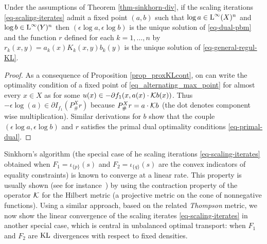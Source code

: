 %
\begin{proposition}
\label{prop_fixpoint}
Under the assumptions of Theorem \ref{thm-sinkhorn-div}, if the scaling iterations \eqref{eq-scaling-iterates} admit a fixed point $(a,b)$ such that $\log a \in\text{\upshape L}^\infty(X)^n$ and $\log b \in \text{\upshape L}^\infty(Y)^n$ then $(\epsilon \log a,\epsilon \log b)$ is the unique solution of \eqref{eq-dual-pbm} and the function $r$ defined for each $k=1,\ldots,n$ by $r_k(x,y)= a_k(x) K_k(x,y) b_k(y)$ is the unique solution of \eqref{eq-general-regul-KL}.
\end{proposition}
\begin{proof}
As a consequence of Proposition \ref{prop_proxKLcont}, on can write the optimality condition of a fixed point of \eqref{eq_alternating_max_point} for almost every $x\in X$ as
for some $u (x)\in -\partial f_1(x,a(x)\cdot\mathcal{K} b(x))$. Thus $-\epsilon \log(a) \in \partial I_{f_1}(P^X_\# r)$ because $P^X_\# r = a \cdot \mathcal{K} b$ (the dot denotes component wise multiplication). Similar derivations for $b$ show that the couple $(\epsilon \log a,\epsilon \log b)$ and $r$ satisfies the primal dual optimality conditions \eqref{eq-primal-dual}.
\end{proof}

Sinkhorn's algorithm (the special case of he scaling iterations \eqref{eq-scaling-iterates} obtained when $F_1=\iota_{\{p\}}(s)$ and $F_2 = \iota_{\{q\}}(s)$ are the convex indicators of equality constraints) is known to converge at a linear rate. This property is usually shown (see for instance~\cite{franklin1989scaling}) by using the contraction property of the operator $\mathcal{K}$ for the Hilbert metric (a projective metric on the cone of nonnegative functions).
%
Using a similar approach, based on the related \textit{Thompson} metric, we now show the linear convergence of the scaling iterates \eqref{eq-scaling-iterates} in another special case, which is central in unbalanced optimal transport: when $F_1$ and $F_2$ are $\operatorname{KL}$ divergences with respect to fixed densities. 

